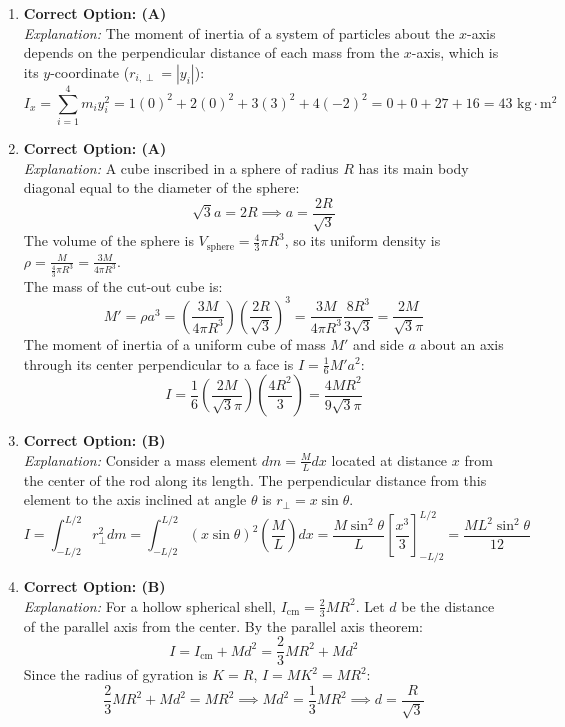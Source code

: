 \documentclass[11pt,a4paper]{article}
\begin{document}
\begin{enumerate}[label=\textbf{Q\arabic*.},leftmargin=24pt,itemsep=10pt]
  \item \textbf{Correct Option: (A)}\\
  \textit{Explanation:} The moment of inertia of a system of particles about the $x$-axis depends on the perpendicular distance of each mass from the $x$-axis, which is its $y$-coordinate ($r_{i,\perp} = |y_i|$):
  \[
    I_x = \sum_{i=1}^4 m_i y_i^2 = 1(0)^2 + 2(0)^2 + 3(3)^2 + 4(-2)^2 = 0 + 0 + 27 + 16 = 43\text{ kg}\cdot\text{m}^2
  \]

  \item \textbf{Correct Option: (A)}\\
  \textit{Explanation:} A cube inscribed in a sphere of radius $R$ has its main body diagonal equal to the diameter of the sphere:
  \[
    \sqrt{3} a = 2R \implies a = \frac{2R}{\sqrt{3}}
  \]
  The volume of the sphere is $V_{\text{sphere}} = \frac{4}{3}\pi R^3$, so its uniform density is $\rho = \frac{M}{\frac{4}{3}\pi R^3} = \frac{3M}{4\pi R^3}$.\\
  The mass of the cut-out cube is:
  \[
    M' = \rho a^3 = \left(\frac{3M}{4\pi R^3}\right) \left(\frac{2R}{\sqrt{3}}\right)^3 = \frac{3M}{4\pi R^3} \frac{8 R^3}{3\sqrt{3}} = \frac{2M}{\sqrt{3}\pi}
  \]
  The moment of inertia of a uniform cube of mass $M'$ and side $a$ about an axis through its center perpendicular to a face is $I = \frac{1}{6} M' a^2$:
  \[
    I = \frac{1}{6} \left(\frac{2M}{\sqrt{3}\pi}\right) \left(\frac{4 R^2}{3}\right) = \frac{4 M R^2}{9\sqrt{3}\pi}
  \]

  \item \textbf{Correct Option: (B)}\\
  \textit{Explanation:} Consider a mass element $dm = \frac{M}{L} dx$ located at distance $x$ from the center of the rod along its length. The perpendicular distance from this element to the axis inclined at angle $\theta$ is $r_\perp = x \sin\theta$.
  \[
    I = \int_{-L/2}^{L/2} r_\perp^2 dm = \int_{-L/2}^{L/2} (x \sin\theta)^2 \left(\frac{M}{L}\right) dx = \frac{M \sin^2\theta}{L} \left[ \frac{x^3}{3} \right]_{-L/2}^{L/2} = \frac{M L^2 \sin^2\theta}{12}
  \]

  \item \textbf{Correct Option: (B)}\\
  \textit{Explanation:} For a hollow spherical shell, $I_{\text{cm}} = \frac{2}{3} M R^2$. Let $d$ be the distance of the parallel axis from the center. By the parallel axis theorem:
  \[
    I = I_{\text{cm}} + M d^2 = \frac{2}{3} M R^2 + M d^2
  \]
  Since the radius of gyration is $K = R$, $I = M K^2 = M R^2$:
  \[
    \frac{2}{3} M R^2 + M d^2 = M R^2 \implies M d^2 = \frac{1}{3} M R^2 \implies d = \frac{R}{\sqrt{3}}
  \]


\end{enumerate}
\end{document}
